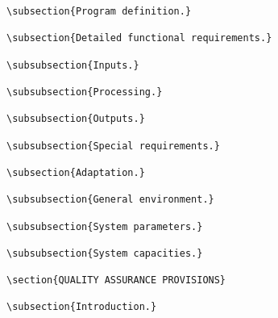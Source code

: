 \begin{itemize}
\begin{small}
\begin{verbatim}
\subsection{Program definition.}

\subsection{Detailed functional requirements.}

\subsubsection{Inputs.}

\subsubsection{Processing.}

\subsubsection{Outputs.}

\subsubsection{Special requirements.}

\subsection{Adaptation.}

\subsubsection{General environment.}

\subsubsection{System parameters.}

\subsubsection{System capacities.}

\section{QUALITY ASSURANCE PROVISIONS}

\subsection{Introduction.}


\end{verbatim}
\end{small}
\end{itemize}
